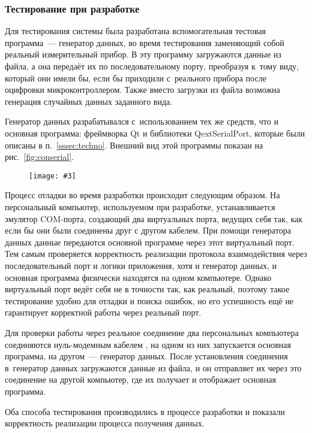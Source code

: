 \documentclass[a4paper, 14pt, titlepage]{extarticle}
\newenvironment{myfigure}[2]%
    {\pushQED{\caption{#1} \label{#2}} %
     \begin{figure}[!htb]\centering } %
    {  \popQED %
     \end{figure}}
\newcommand{\includefigure}[3][]{
    \begin{myfigure}{#2}{fig:#3}
      \texttt{[image: \#3]}
    \end{myfigure}
  }
\begin{document}
  \subsubsection{Тестирование при разработке}

  Для тестирования системы была разработана вспомогательная тестовая программа~--- генератор данных,
  во время тестирования заменяющий собой реальный измерительный прибор. В эту программу загружаются данные из
  файла, а она передаёт их по последовательному порту, преобразуя к~тому виду, который они имели бы,
  если бы приходили с~реального прибора после оцифровки микроконтроллером. Также вместо загрузки из
  файла возможна генерация случайных данных заданного вида.

  Генератор данных разрабатывался с~использованием тех же средств, что и основная программа:
  фреймворка Qt и библиотеки QextSerialPort, которые были описаны в п.~\ref{sssec:techno}.
  Внешний вид этой программы показан на рис.~\ref{fig:conserial}.

  \includefigure[width=0.4\textwidth]{Тестовая программа~--- генератор данных}{conserial}

  Процесс отладки во время разработки происходит следующим образом. На персональный компьютер,
  используемом при разработке, устанавливается эмулятор COM-порта, создающий два виртуальных порта,
  ведущих себя так, как если бы они были соединены друг с другом кабелем. При помощи генератора
  данных данные передаются основной программе через этот виртуальный порт. Тем самым проверяется
  корректность реализации протокола взаимодействия через последовательный порт и логики приложения, хотя и
  генератор данных, и основная программа физически находятся на одном компьютере.
  Однако виртуальный порт ведёт себя не в точности так, как реальный, поэтому такое тестирование
  удобно для отладки и поиска ошибок, но его успешность ещё не гарантирует корректной работы через
  реальный порт.

  Для проверки работы через реальное соединение два персональных компьютера
  соединяются нуль-модемным кабелем \cite{null-modem}, на одном из них запускается основная
  программа, на другом~--- генератор данных. После установления соединения в~генератор данных
  загружаются данные из файла, и он отправляет их через это соединение на другой компьютер, где их
  получает и отображает основная программа.

  Оба способа тестирования производились в процессе разработки и показали корректность реализации
  процесса получения данных.
\end{document}
